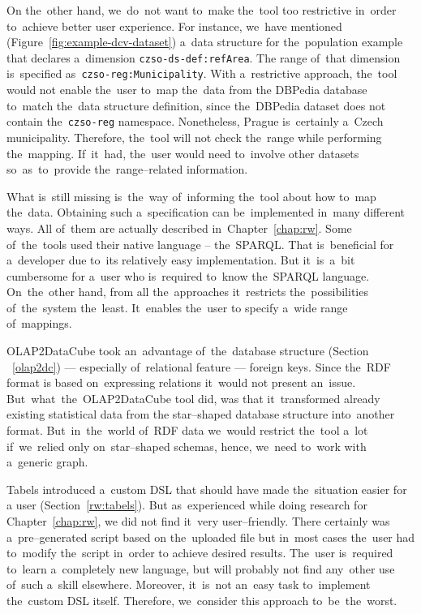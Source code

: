 \begin{sloppypar}
On the~other hand, we~do~not want to~make the~tool too restrictive in~order to~achieve better user experience. For instance, we~have mentioned
(Figure~\ref{fig:example-dcv-dataset}) a~data structure 
for the~population example that declares a~dimension \texttt{czso-ds-def:refArea}. 
The range of~that dimension is~specified as~\texttt{czso-reg:Municipality}. 
With a~restrictive approach, the~tool would not enable the~user to~map the~data from 
the DBPedia database to~match the~data structure definition, since the~DBPedia 
dataset does not contain the~\texttt{czso-reg} namespace. Nonetheless, Prague is~certainly a~Czech municipality. Therefore, the~tool will not check the~range 
while performing the~mapping. If~it~had, the~user would need to~involve 
other datasets so~as~to~provide the~range--related information.
\end{sloppypar}

What is~still missing is~the~way of~informing the~tool about how to~map the~data.
Obtaining such a~specification can be~implemented in~many different ways. 
All of~them are actually described in~Chapter~\ref{chap:rw}. Some of~the~tools used 
their native language -- the~SPARQL. That is~beneficial for a~developer due to~its relatively easy implementation. But it~is~a~bit cumbersome for a~user 
who is~required to~know the~SPARQL language. On~the~other hand, from all the~approaches
it~restricts the~possibilities of~the~system the~least. It~enables the~user 
to specify a~wide range of~mappings.

\begin{sloppypar}
OLAP2DataCube took an~advantage of~the~database structure (Section ~\ref{olap2dc}) --- 
especially of~relational feature --- foreign keys. Since the~RDF format 
is based on~expressing relations it~would not present an~issue. But~what~the~OLAP2DataCube tool did, was that it~transformed already existing statistical data from
the star--shaped database structure into~another format. But~in~the~world of~RDF 
data we~would restrict the~tool a~lot if~we~relied only on~star--shaped 
schemas, hence, we~need to~work with a~generic graph.
\end{sloppypar}

Tabels introduced a~custom DSL that should have made the~situation easier for 
a user (Section~\ref{rw:tabels}). But as~experienced while doing research for Chapter~\ref{chap:rw}, 
we did not find it~very user--friendly. There certainly was a~pre--generated script based
on the~uploaded file but in~most cases the~user had to~modify the~script in~order to
achieve desired results. The~user is~required to~learn a~completely new language, but will probably not find any~other use of~such a~skill
elsewhere. Moreover, it~is~not an~easy task to~implement the~custom DSL itself. Therefore, we~consider this approach to~be~the~worst.

